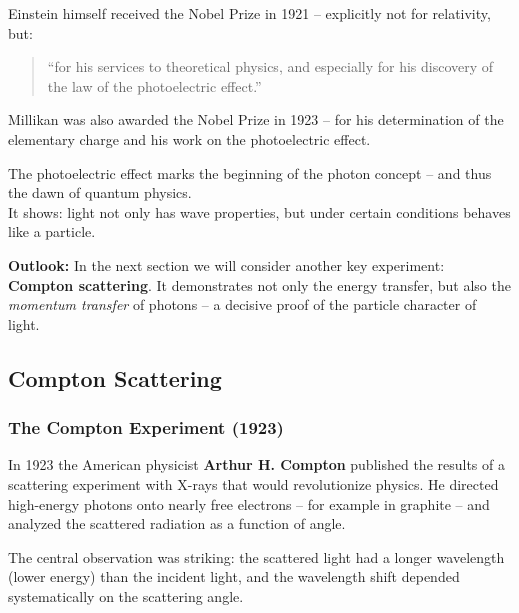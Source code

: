Einstein himself received the Nobel Prize in 1921 – explicitly not for relativity, but:
\begin{quote}
	“for his services to theoretical physics, and especially for his discovery of the law of the photoelectric effect.”
\end{quote}

Millikan was also awarded the Nobel Prize in 1923 – for his determination of the elementary charge and his work on the photoelectric effect.

\vspace{1em}
\begin{tcolorbox}[hinweisbox, title=Conclusion]
	\label{box:fazit der photo}
	\small
	The photoelectric effect marks the beginning of the photon concept – and thus the dawn of quantum physics.\\
	It shows: light not only has wave properties, but under certain conditions behaves like a particle.
\end{tcolorbox}
\vspace{1em}

\textbf{Outlook:}  
In the next section we will consider another key experiment: \textbf{Compton scattering}. It demonstrates not only the energy transfer, but also the \emph{momentum transfer} of photons – a decisive proof of the particle character of light.

\subsection{Compton Scattering}

\subsubsection{The Compton Experiment (1923)}

In 1923 the American physicist \textbf{Arthur H. Compton} published the results of a scattering experiment with X-rays that would revolutionize physics. He directed high-energy photons onto nearly free electrons – for example in graphite – and analyzed the scattered radiation as a function of angle.

The central observation was striking: the scattered light had a longer wavelength (lower energy) than the incident light, and the wavelength shift depended systematically on the scattering angle.

